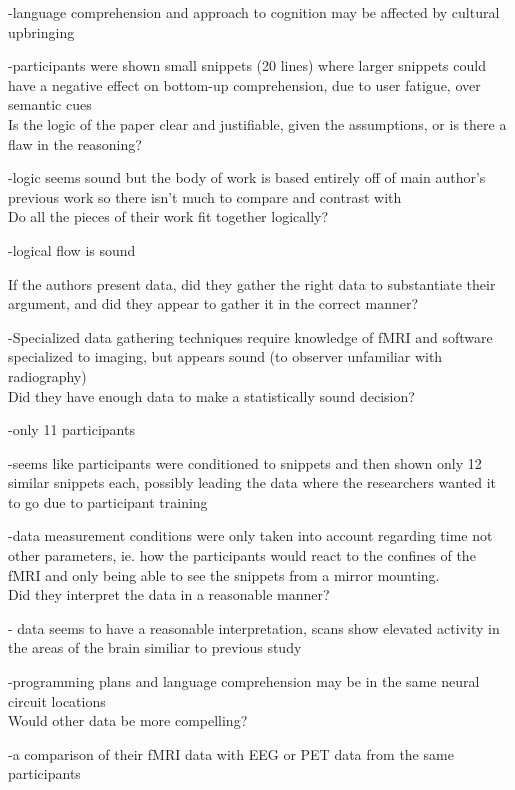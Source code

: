 \documentclass{IEEEtran}
\begin{document}
-language comprehension and approach to cognition may be affected by cultural upbringing

-participants were shown small snippets (20 lines) where larger snippets could have a negative effect on bottom-up 
comprehension, due to user fatigue, over semantic cues
\\

Is the logic of the paper clear and justifiable, given the assumptions, or is there a flaw in the reasoning?

-logic seems sound but the body of work is based entirely off of main author's previous work so there isn't much to 
compare and contrast with
\\

Do all the pieces of their work fit together logically?

-logical flow is sound

If the authors present data, did they gather the right data to substantiate their argument, and did they appear to 
gather it in the correct manner?

-Specialized data gathering techniques require knowledge of fMRI and software specialized to imaging, but appears 
sound (to observer unfamiliar with radiography)
\\

Did they have enough data to make a statistically sound decision?

-only 11 participants

-seems like participants were conditioned to snippets and then shown only 12 similar snippets each, possibly leading 
the data where the researchers wanted it to go due to participant training

-data measurement conditions were only taken into account regarding time not other parameters, ie. how the 
participants would react to the confines of the fMRI and only being able to see the snippets from a mirror mounting.
\\

Did they interpret the data in a reasonable manner?

- data seems to have a reasonable interpretation, scans show elevated activity in the areas of the brain similiar to 
previous study

-programming plans and language comprehension may be in the same neural circuit locations
\\

Would other data be more compelling?

-a comparison of their fMRI data with EEG or PET data from the same participants
\\
\end{document}
